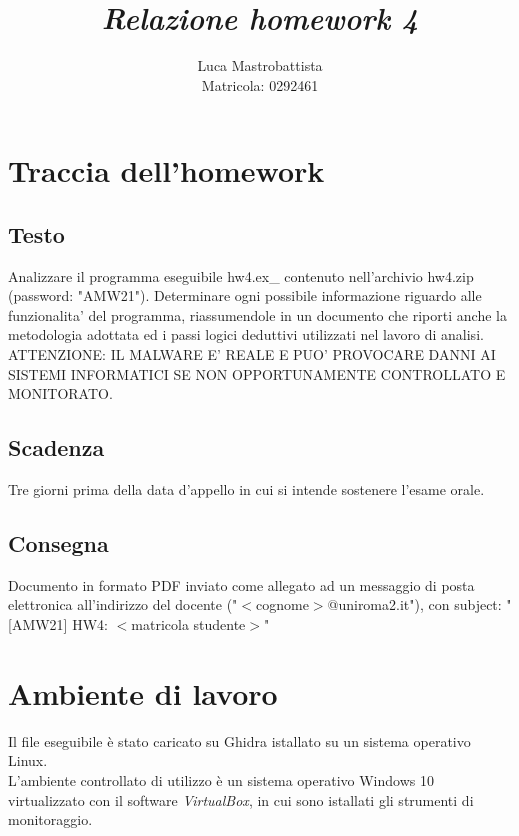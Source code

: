 \documentclass[a4paper, 12pt]{article}
\begin{document}
\sloppy
  
\title{
  \textbf{
    \emph{Relazione homework 4}
  }
}  
\author{Luca Mastrobattista\\ Matricola: 0292461}
\date{}
\maketitle

\tableofcontents
\newpage
\section{Traccia dell'homework}
\subsection{Testo}
Analizzare il programma eseguibile hw4.ex\_ contenuto
nell'archivio hw4.zip (password: "AMW21").
Determinare ogni possibile informazione riguardo alle
funzionalita' del programma, riassumendole in un documento
che riporti anche la metodologia adottata ed i passi logici
deduttivi utilizzati nel lavoro di analisi.\\
ATTENZIONE: IL MALWARE E' REALE E PUO' PROVOCARE DANNI AI
SISTEMI INFORMATICI SE NON OPPORTUNAMENTE CONTROLLATO E
MONITORATO.

\subsection{Scadenza}
Tre giorni prima della data d'appello in cui si
intende sostenere l'esame orale.

\subsection{Consegna}
Documento in formato PDF inviato come allegato ad
un messaggio di posta elettronica all'indirizzo del docente
("$<$cognome$>$@uniroma2.it"), con subject:
"[AMW21] HW4: $<$matricola studente$>$"

\newpage
\section{Ambiente di lavoro}
Il file eseguibile è stato caricato su Ghidra istallato su un sistema operativo Linux. \\
L'ambiente controllato di utilizzo è un sistema operativo Windows 10 virtualizzato con il software \emph{VirtualBox}, in cui sono istallati gli strumenti di monitoraggio.
\end{document}
